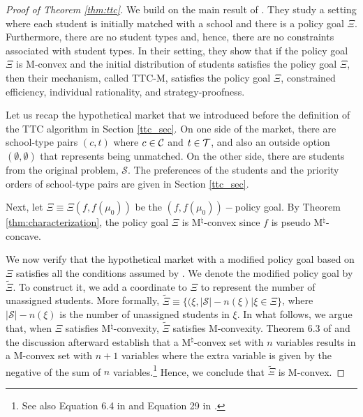 \documentclass[12pt]{amsart}
\theoremstyle{remark}
\def\S{\mathcal{S}} \def\cals{\mathcal{S}}
\newcommand{\ieh}[1]{{\color{orange} IEH: #1 }}
\newcommand{\mby}[1]{{\color{blue} MBY: #1 }}
\begin{document}
\begin{proof}[Proof of Theorem \ref{thm:ttc}]
We build on the main result of \cite{suzuki17}. They study a setting where each student is initially matched with a school and there is a policy goal $\Xi$. Furthermore, there are no student types and, hence, there are no constraints associated with student types.
In their setting, they show that if the policy goal $\Xi$ is M-convex and the initial distribution of students satisfies the policy
goal $\Xi$, then their mechanism, called TTC-M, satisfies the policy goal $\Xi$, constrained efficiency, individual rationality, and strategy-proofness.

\begin{comment}
In our setting, however, students have types, and not all students need to be initially or eventually matched. Moreover, we model the distributional
objective as a function that satisfies pseudo M$^{\natural}$-concavity rather than assuming that there is a policy goal that satisfies M-convexity.
\mby{Do we need this paragraph in the proof?}\ieh{Not really, we can take it out.}
\end{comment}

Let us recap the hypothetical market that we introduced before the definition of the TTC algorithm in Section \ref{ttc_sec}. On one side of the market, there are school-type pairs $(c,t)$
where $c\in \mathcal{C}$ and $t\in \mathcal{T}$, and also an outside option $(\emptyset,\emptyset)$ that represents being unmatched.
On the other side, there are students from the original problem, $\S$. The preferences of the students and
the priority orders of school-type pairs are given in Section \ref{ttc_sec}.

Next, let $\Xi \equiv \Xi(f,f(\mu_0))$ be the $(f,f(\mu_0))-$policy goal.
By Theorem \ref{thm:characterization}, the policy goal $\Xi$ is M$^{\natural}$-convex since $f$ is pseudo M$^{\natural}$-concave.

We now verify that the hypothetical market with a modified policy goal based on $\Xi$ satisfies all the conditions assumed by \cite{suzuki17}.
We denote the modified policy goal by $\tilde{\Xi}$. To construct it, we add a coordinate to $\Xi$
to represent the number of unassigned students. More formally,
$\tilde{\Xi} \equiv \{(\xi,|\mathcal S|- n(\xi)| \xi \in \Xi\}$, where $|\mathcal S|- n(\xi)$ is
the number of unassigned students in $\xi$.
In what follows, we argue that, when $\Xi$ satisfies M$^{\natural}$-convexity,  $\tilde{\Xi}$ satisfies M-convexity.
Theorem 6.3 of \cite{Murota:SIAM:2003}
and the discussion afterward establish that a M$^{\natural}$-convex set with $n$ variables results in a M-convex set with $n+1$
variables where the extra variable is given by the negative of the sum of $n$ variables.\footnote{See also Equation 6.4 in \cite{Murota:SIAM:2003} and Equation 29 in \cite{murota2021survey}.}
Hence,  we conclude that $\tilde{\Xi}$ is M-convex.


\end{proof}
\end{document}
